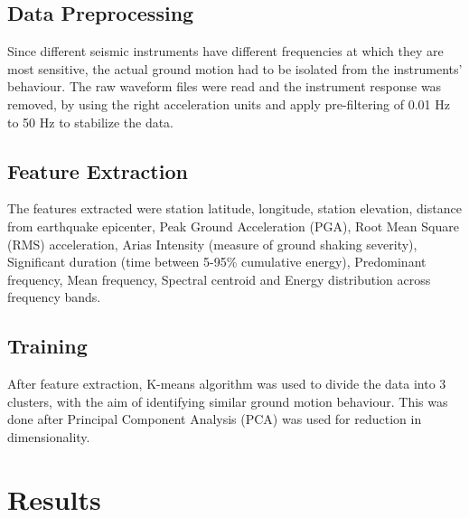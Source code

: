 \documentclass[conference]{IEEEtran}
\begin{document}
\subsection{Data Preprocessing}
\label{sec:orgd9f8199}
Since different seismic instruments have different frequencies at which they are
most sensitive, the actual ground motion had to be isolated from the
instruments' behaviour. The raw waveform files were read and the instrument
response was removed, by using the right acceleration units and apply
pre-filtering of 0.01 Hz to 50 Hz to stabilize the data.
\subsection{Feature Extraction}
\label{sec:org1a5941c}
The features extracted were station latitude, longitude, station elevation,
distance from earthquake epicenter, Peak Ground Acceleration (PGA), Root Mean
Square (RMS) acceleration, Arias Intensity (measure of ground shaking severity),
Significant duration (time between 5-95\% cumulative energy), Predominant
frequency, Mean frequency, Spectral centroid and Energy distribution across
frequency bands.
\subsection{Training}
\label{sec:org92352c3}
After feature extraction, K-means algorithm was used to divide the data into 3
clusters, with the aim of identifying similar ground motion behaviour. This was
done after Principal Component Analysis (PCA) was used for reduction in
dimensionality.
\section{Results}
\label{sec:org226fbdd}
\end{document}
